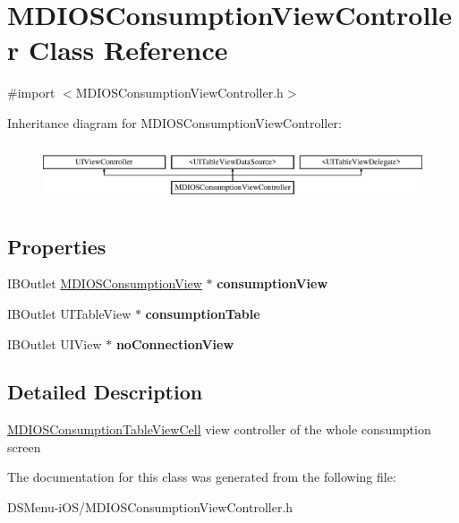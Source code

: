 \hypertarget{interface_m_d_i_o_s_consumption_view_controller}{\section{M\-D\-I\-O\-S\-Consumption\-View\-Controller Class Reference}
\label{interface_m_d_i_o_s_consumption_view_controller}
}


{\ttfamily \#import $<$M\-D\-I\-O\-S\-Consumption\-View\-Controller.\-h$>$}

Inheritance diagram for M\-D\-I\-O\-S\-Consumption\-View\-Controller\-:\begin{figure}[H]
\begin{center}
\leavevmode
\includegraphics[height=1.720430cm]{interface_m_d_i_o_s_consumption_view_controller}
\end{center}
\end{figure}
\subsection*{Properties}
\begin{DoxyCompactItemize}
\item 
\hypertarget{interface_m_d_i_o_s_consumption_view_controller_a1966c37b3c82a6d9a84717c109c31cf1}{I\-B\-Outlet \hyperlink{interface_m_d_i_o_s_consumption_view}{M\-D\-I\-O\-S\-Consumption\-View} $\ast$ {\bfseries consumption\-View}}\label{interface_m_d_i_o_s_consumption_view_controller_a1966c37b3c82a6d9a84717c109c31cf1}

\item 
\hypertarget{interface_m_d_i_o_s_consumption_view_controller_a75d6b58f5f0d05dade25f3037b7fe54d}{I\-B\-Outlet U\-I\-Table\-View $\ast$ {\bfseries consumption\-Table}}\label{interface_m_d_i_o_s_consumption_view_controller_a75d6b58f5f0d05dade25f3037b7fe54d}

\item 
\hypertarget{interface_m_d_i_o_s_consumption_view_controller_a3fbeddbcef08fa0ef72e563349dbb077}{I\-B\-Outlet U\-I\-View $\ast$ {\bfseries no\-Connection\-View}}\label{interface_m_d_i_o_s_consumption_view_controller_a3fbeddbcef08fa0ef72e563349dbb077}

\end{DoxyCompactItemize}


\subsection{Detailed Description}
\hyperlink{interface_m_d_i_o_s_consumption_table_view_cell}{M\-D\-I\-O\-S\-Consumption\-Table\-View\-Cell} view controller of the whole consumption screen 

The documentation for this class was generated from the following file\-:\begin{DoxyCompactItemize}
\item 
D\-S\-Menu-\/i\-O\-S/M\-D\-I\-O\-S\-Consumption\-View\-Controller.\-h\end{DoxyCompactItemize}
